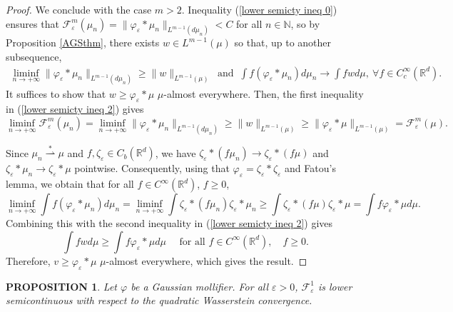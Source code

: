 \documentclass[11pt,leqno]{amsart}
\newtheorem{prop}[thm]{PROPOSITION}
\theoremstyle{definition}
\newcommand{\Rd}{{\mathord{\mathbb R}^d}}
\newcommand{\wsto}{\stackrel{*}{\rightharpoonup}}
\newcommand{\F}{\mathcal{F}}
\def\e{\varepsilon}
\def\F{\mathcal{F}}
\begin{document}
\begin{proof}
 We conclude with the case $m > 2$. Inequality (\ref{lower semicty ineq 0}) ensures that $\F^m_\e(\mu_n) = \|\varphi_\e*\mu_n\|_{L^{m-1}(d \mu_n)} < C$ for all $n \in \mathbb{N}$, so by Proposition \ref{AGSthm}, there exists $w \in L^{m-1}(\mu)$ so that, up to another subsequence, 
 \begin{align} \label{lower semicty ineq 2} \liminf_{n \to +\infty} \|\varphi_\e*\mu_n\|_{L^{m-1}(d \mu_n)} \geq  \|w\|_{L^{m-1}(\mu)} \ \text{ and } \  \int f (\varphi_\e *\mu_n) d \mu_n \to \int f w d \mu,  \ \forall f \in C^\infty_c(\Rd). 
 \end{align}
 It suffices to show that $w \geq \varphi_\e*\mu$ $\mu$-almost everywhere. Then, the first inequality in (\ref{lower semicty ineq 2}) gives
 \[ \liminf_{n \to +\infty} \F^m_\e(\mu_n) = \liminf_{n \to +\infty} \|\varphi_\e*\mu_n\|_{L^{m-1}(d \mu_n)} \geq  \|w\|_{L^{m-1}(\mu)} \geq \|\varphi_\e*\mu \|_{L^{m-1}(\mu)} = \F_\e^m(\mu) . \]

Since $\mu_n \wsto \mu$ and $f, \zeta_\e \in C_b(\Rd)$, we have $\zeta_\e*( f \mu_n) \to \zeta_\e*( f \mu)$ and $\zeta_\e*\mu_n \to \zeta_\e *\mu$ pointwise.
Consequently, using that $\varphi_\e = \zeta_\e *\zeta_\e$ and Fatou's lemma, we obtain that for all $f \in C^\infty(\Rd)$, $f \geq 0$, 
\[ \liminf_{n \to +\infty} \int f (\varphi_\e *\mu_n) d \mu_n = \liminf_{n \to +\infty} \int \zeta_\e*( f \mu_n) \zeta_\e*\mu_n \geq \int \zeta_\e *(f \mu) \zeta_\e *\mu = \int f \varphi_\e* \mu d \mu .\]
Combining this with the second inequality in (\ref{lower semicty ineq 2}) gives
\[ \int f w d \mu \geq \int f \varphi_\e* \mu d \mu \quad \text{ for all } f \in C^\infty(\Rd), \quad f \geq 0 .\]
Therefore, $v \geq \varphi_\e* \mu$ $\mu$-almost everywhere, which gives the result.
\end{proof}

\begin{prop} \label{lscm1}
	Let $\varphi$ be a Gaussian mollifier. For all $\e >0$, $\F^1_\e$ is lower semicontinuous with respect to the quadratic Wasserstein convergence.
\end{prop}
\end{document}

